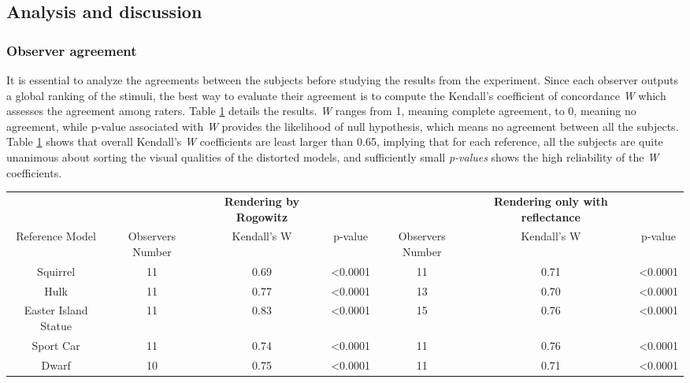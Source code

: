 \subsection{Analysis and discussion}
\subsubsection{Observer agreement}
It is essential to analyze the agreements between the subjects before studying the results from the experiment. Since each observer outputs a global ranking of the stimuli, the best way to evaluate their agreement is to compute the Kendall's coefficient of concordance \textit{W} \cite{Kendall_1940} which assesses the agreement among raters. Table \ref{tab-W} details the results. \textit{W} ranges from 1, meaning complete agreement, to 0, meaning no agreement, while p-value associated with \textit{W} provides the likelihood of null hypothesis, which means no agreement between all the subjects. Table \ref{tab-W} shows that overall Kendall’s \textit{W} coefficients are least larger than 0.65, implying that for each reference, all the subjects are quite unanimous about sorting the visual qualities of the distorted models, and sufficiently small \textit{p-values} shows the high reliability of the \textit{W} coefficients.\\
\begin{table}

    \begin{tabular}{c c c c c c c}
                              &                  & \textbf{Rendering by Rogowitz} &                 &                  & \textbf{Rendering only with reflectance} &                 \\
Reference Model               & Observers Number & Kendall's W                    & p-value         & Observers Number & Kendall's W                             & p-value         \\
Squirrel            & 11               & 0.69                           & \textless0.0001 & 11               & 0.71                                     & \textless0.0001 \\
Hulk                 & 11               & 0.77                           & \textless0.0001 & 13               & 0.70                                      & \textless0.0001 \\
Easter Island Statue & 11               & 0.83                           & \textless0.0001 & 15               & 0.76                                     & \textless0.0001 \\
Sport Car            & 11               & 0.74                           & \textless0.0001 & 11               & 0.76                                     & \textless0.0001 \\
Dwarf                & 10               & 0.75                           & \textless0.0001 & 11               & 0.71                                     & \textless0.0001
    \end{tabular}%
		
   \label{tab-W}
\end{table}


